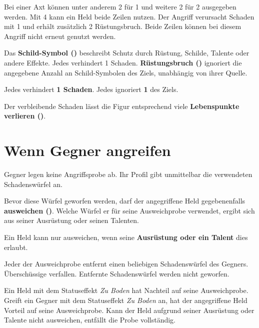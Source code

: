 \begin{beispiel}[title=Beispiel: Schaden und Kampfeffekt kombinieren]
Bei einer Axt können unter anderem 2\star{} für 1\redDmgDie{} und weitere 2\star{} für \effectArmorBreak{} 2 ausgegeben werden. Mit 4\star{} kann ein Held beide Zeilen nutzen. Der Angriff verursacht Schaden mit 1\redDmgDie{} und erhält zusätzlich 2 Rüstungsbruch. Beide Zeilen können bei diesem Angriff nicht erneut genutzt werden.
\end{beispiel}

Das \textbf{Schild-Symbol (\armor)} beschreibt Schutz durch Rüstung, Schilde, Talente oder andere Effekte. Jedes \armor{} verhindert 1 Schaden. \textbf{Rüstungsbruch (\armorPierce)} ignoriert die angegebene Anzahl an Schild-Symbolen des Ziels, unabhängig von ihrer Quelle.

\begin{kurzregel}[title=Schild-Symbole und Rüstungsbruch]
Jedes \armor{} verhindert \textbf{1 Schaden}. Jedes \armorPierce{} ignoriert \textbf{1 \armor{}} des Ziels.
\end{kurzregel}

Der verbleibende Schaden lässt die Figur entsprechend viele \textbf{Lebenspunkte verlieren (\lifeLoss)}.

\section{Wenn Gegner angreifen}

Gegner legen keine Angriffsprobe ab. Ihr Profil gibt unmittelbar die verwendeten Schadenswürfel an.

Bevor diese Würfel geworfen werden, darf der angegriffene Held gegebenenfalls \textbf{ausweichen (\evade)}. Welche Würfel er für seine Ausweichprobe verwendet, ergibt sich aus seiner Ausrüstung oder seinen Talenten.

\begin{kurzregel}[title=Ausweichen]
Ein Held kann nur ausweichen, wenn seine \textbf{Ausrüstung oder ein Talent} dies erlaubt.

Jeder \star{} der Ausweichprobe entfernt einen beliebigen Schadenswürfel des Gegners. Überschüssige \star{} verfallen. Entfernte Schadenswürfel werden nicht geworfen.
\end{kurzregel}

Ein Held mit dem Statuseffekt \emph{Zu Boden} hat Nachteil auf seine Ausweichprobe. Greift ein Gegner mit dem Statuseffekt \emph{Zu Boden} an, hat der angegriffene Held Vorteil auf seine Ausweichprobe. Kann der Held aufgrund seiner Ausrüstung oder Talente nicht ausweichen, entfällt die Probe vollständig.

